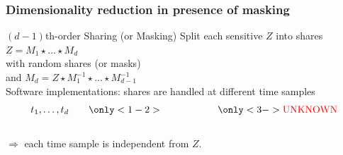 



\begin{frame}
\frametitle{Dimensionality reduction in presence of masking}
\begin{block}{$(d-1)$th-order Sharing (or Masking)} 
Split each sensitive $Z$ into shares  $Z = M_1 \star \dots \star M_d$ \\
with  random shares (or masks)  \\ and $M_d = Z \star M_1^{-1}\star \dots \star M_{d-1}^{-1}$ \\
Software implementations: shares are handled at different time samples $$t_1,\dots, t_d \qquad \only<1-2>{\mbox{\textcolor{white}{UNKNOWN}}} \only<3->{\mbox{\textcolor{red}{UNKNOWN}}} $$\\
$\Rightarrow$ each time sample is independent from $Z$.\\
\end{block}

\end{frame}



